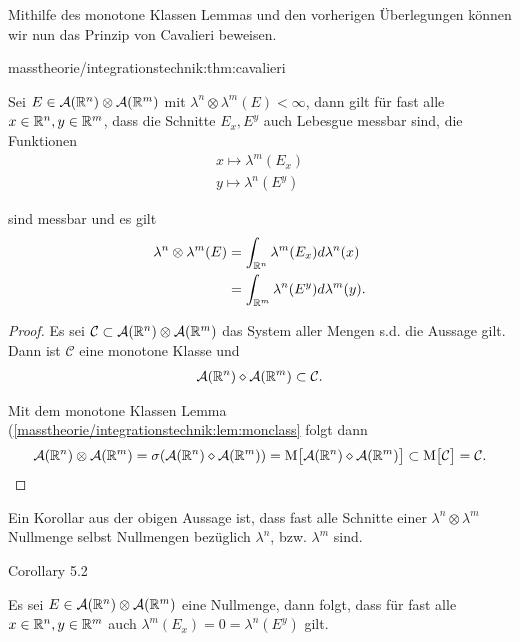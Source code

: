 \par
Mithilfe des monotone Klassen Lemmas und den vorherigen Überlegungen können wir nun das Prinzip von Cavalieri beweisen.
\begin{theorem}{}{masstheorie/integrationstechnik:thm:cavalieri}



\par
Sei \(E \in \mathcal{A}(\mathbb{R}^n)\otimes\mathcal{A}(\mathbb{R}^m)\) mit \(\lambda^{n}\otimes\lambda^{m}(E) < \infty\),
dann gilt für fast alle \(x\in\mathbb{R}^n,y\in\mathbb{R}^m\), dass die Schnitte \(E_x, E^y\) auch Lebesgue messbar sind, die Funktionen
\begin{align*}
x \mapsto \lambda^m(E_x)\\
y \mapsto \lambda^n(E^y)
\end{align*}
\par
sind messbar und es gilt
\begin{align*}
\lambda^{n}\otimes\lambda^{m}(E) &= \int_{\mathbb{R}^n} \lambda^m(E_x) d\lambda^n(x)\\
&=
\int_{\mathbb{R}^m} \lambda^n(E^y) d\lambda^m(y).
\end{align*}\end{theorem}

\begin{proof}
 Es sei \(\mathcal{C}\subset\mathcal{A}(\mathbb{R}^n)\otimes\mathcal{A}(\mathbb{R}^m)\) das System aller Mengen s.d. die Aussage gilt. Dann ist \(\mathcal{C}\) eine monotone Klasse und
\begin{align*}
\mathcal{A}(\mathbb{R}^n)\diamond\mathcal{A}(\mathbb{R}^m)\subset \mathcal{C}.
\end{align*}
\par
Mit dem monotone Klassen Lemma (\cref{masstheorie/integrationstechnik:lem:monclass}  folgt dann
\begin{align*}
\mathcal{A}(\mathbb{R}^n)\otimes\mathcal{A}(\mathbb{R}^m) = \sigma(\mathcal{A}(\mathbb{R}^n)\diamond\mathcal{A}(\mathbb{R}^m)) = 
\text{M}\big[\mathcal{A}(\mathbb{R}^n)\diamond\mathcal{A}(\mathbb{R}^m)\big] \subset 
\text{M}\big[\mathcal{C}\big] = \mathcal{C}.
\end{align*}\end{proof}

\par
Ein Korollar aus der obigen Aussage ist, dass fast alle Schnitte einer \(\lambda^n\otimes\lambda^m\) Nullmenge selbst Nullmengen bezüglich \(\lambda^n\), bzw. \(\lambda^m\) sind.
\label{masstheorie/integrationstechnik:cor:zeroprodset}
\begin{emphBox}{}{}{Corollary 5.2}



\par
Es sei \(E\in\mathcal{A}(\mathbb{R}^n)\otimes\mathcal{A}(\mathbb{R}^m)\) eine Nullmenge, dann folgt, dass für fast alle \(x\in\mathbb{R}^n,y\in\mathbb{R}^m\) auch \(\lambda^m(E_x)=0=\lambda^n(E^y)\) gilt.
\end{emphBox}


